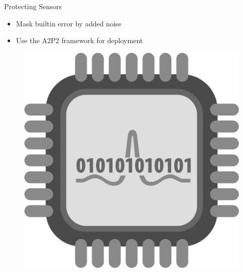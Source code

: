 \documentclass[aspectratio=169]{beamer}
[aspectratio=169] %
\begin{document}
\begin{frame}{Protecting Sensors}
  \begin{minipage}{0.49\textwidth} 
    \begin{itemize}
      \item Mask builtin error by added noise
      \pause
      \item Use the A2P2 framework for deployment
    \end{itemize}
  \end{minipage}
  \hfill
  \begin{minipage}{0.49\textwidth} 
    \begin{figure}
      \centering
      \includegraphics[height=0.5\textheight]{figures/analog.png}
    \end{figure}
  \end{minipage}
\end{frame}
\end{document}
